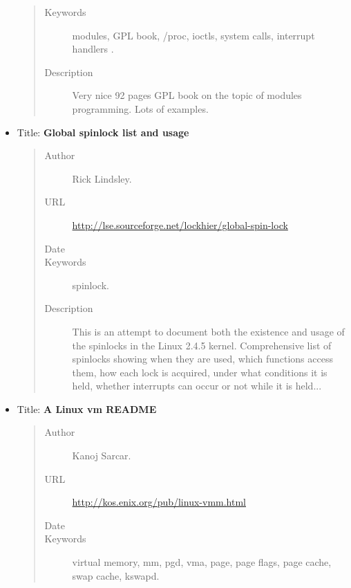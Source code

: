 \documentclass[a4paper,8pt,english]{sphinxmanual}
\begin{document}
\begin{itemize}
\begin{quote}
\begin{description}
\item[{Keywords}] \leavevmode
modules, GPL book, /proc, ioctls, system calls,
interrupt handlers .

\item[{Description}] \leavevmode
Very nice 92 pages GPL book on the topic of modules
programming. Lots of examples.

\end{description}\end{quote}

\item {} 
Title: \textbf{Global spinlock list and usage}
\begin{quote}\begin{description}
\item[{Author}] \leavevmode
Rick Lindsley.

\item[{URL}] \leavevmode
\href{http://lse.sourceforge.net/lockhier/global-spin-lock}{http://lse.sourceforge.net/lockhier/global-spin-lock}

\item[{Date}] 

\item[{Keywords}] \leavevmode
spinlock.

\item[{Description}] \leavevmode
This is an attempt to document both the existence and
usage of the spinlocks in the Linux 2.4.5 kernel. Comprehensive
list of spinlocks showing when they are used, which functions
access them, how each lock is acquired, under what conditions it
is held, whether interrupts can occur or not while it is held...

\end{description}\end{quote}

\item {} 
Title: \textbf{A Linux vm README}
\begin{quote}\begin{description}
\item[{Author}] \leavevmode
Kanoj Sarcar.

\item[{URL}] \leavevmode
\href{http://kos.enix.org/pub/linux-vmm.html}{http://kos.enix.org/pub/linux-vmm.html}

\item[{Date}] 

\item[{Keywords}] \leavevmode
virtual memory, mm, pgd, vma, page, page flags, page
cache, swap cache, kswapd.


\end{description}
\end{quote}
\end{itemize}
\end{document}
